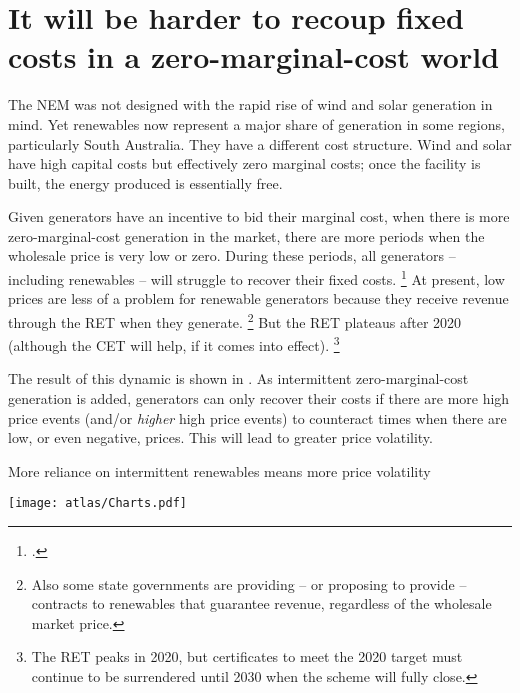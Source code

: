 \documentclass[FrontPage]{grattan}
\begin{document}
\section{It will be harder to recoup fixed costs in a zero-marginal-cost world}\label{sec:it-will-be-harder-to-recoup-fixed-costs-in-a-zero-marginal-cost-world}

The NEM was not designed with the rapid rise of wind and solar generation in mind. Yet renewables now represent a major share of generation in some regions, particularly South Australia. They have a different cost structure. Wind and solar have high capital costs but effectively zero marginal costs; once the facility is built, the energy produced is essentially free.

Given generators have an incentive to bid their marginal cost, when there is more zero-marginal-cost generation in the market, there are more periods when the wholesale price is very low or zero. During these periods, all generators -- including renewables -- will struggle to recover their fixed costs.%
\footcite{Riesz2013CapacityMarket}
At present, low prices are less of a problem for renewable generators because they receive revenue through the RET when they generate.%
\footnote{Also some state governments are providing -- or proposing to provide -- contracts to renewables that guarantee revenue, regardless of the wholesale market price.}
But the RET plateaus after 2020 (although the CET will help, if it comes into effect).%
\footnote{The RET peaks in 2020, but certificates to meet the 2020 target must continue to be surrendered until 2030 when the scheme will fully close.}

The result of this dynamic is shown in . As intermittent zero-marginal-cost generation is added, generators can only recover their costs if there are more high price events (and/or \emph{higher} high price events) to counteract times when there are low, or even negative, prices. This will lead to greater price volatility.

\begin{figureTop}
\caption{More reliance on intermittent renewables means more price volatility}\label{fig:hypothetical-example-of-intermittent-renewables-price-volatility}
\units{}
\texttt{[image: atlas/Charts.pdf]}
\end{figureTop}
\end{document}
